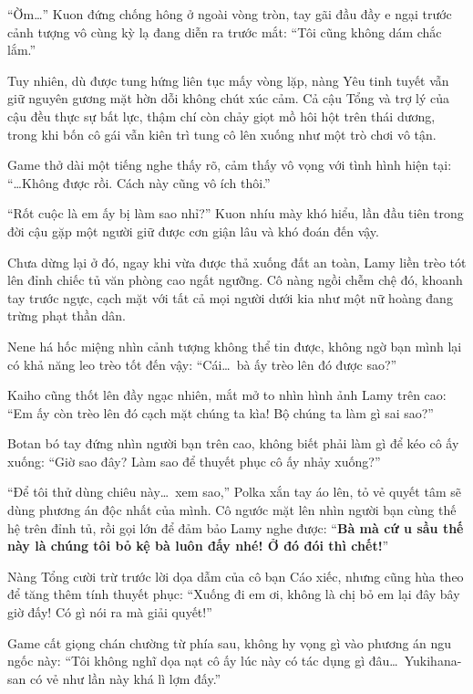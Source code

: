 \documentclass[../main.tex]{subfiles}
\begin{document}
``Ờm\dots'' Kuon đứng chống hông ở ngoài vòng tròn, tay gãi đầu đầy e ngại trước cảnh tượng vô cùng kỳ lạ đang diễn ra trước mắt: ``Tôi cũng không dám chắc lắm.''

Tuy nhiên, dù được tung hứng liên tục mấy vòng lặp, nàng Yêu tinh tuyết vẫn giữ nguyên gương mặt hờn dỗi không chút xúc cảm. Cả cậu Tổng và trợ lý của cậu đều thực sự bất lực, thậm chí còn chảy giọt mồ hôi hột trên thái dương, trong khi bốn cô gái vẫn kiên trì tung cô lên xuống như một trò chơi vô tận.

Game thở dài một tiếng nghe thấy rõ, cảm thấy vô vọng với tình hình hiện tại: ``\dots Không được rồi. Cách này cũng vô ích thôi.''

``Rốt cuộc là em ấy bị làm sao nhỉ?'' Kuon nhíu mày khó hiểu, lần đầu tiên trong đời cậu gặp một người giữ được cơn giận lâu và khó đoán đến vậy.

Chưa dừng lại ở đó, ngay khi vừa được thả xuống đất an toàn, Lamy liền trèo tót lên đỉnh chiếc tủ văn phòng cao ngất ngưỡng. Cô nàng ngồi chễm chệ đó, khoanh tay trước ngực, cạch mặt với tất cả mọi người dưới kia như một nữ hoàng đang trừng phạt thần dân.


Nene há hốc miệng nhìn cảnh tượng không thể tin được, không ngờ bạn mình lại có khả năng leo trèo tốt đến vậy: ``Cái\dots\ bà ấy trèo lên đó được sao?''

Kaiho cũng thốt lên đầy ngạc nhiên, mắt mở to nhìn hình ảnh Lamy trên cao: ``Em ấy còn trèo lên đó cạch mặt chúng ta kìa! Bộ chúng ta làm gì sai sao?''

Botan bó tay đứng nhìn người bạn trên cao, không biết phải làm gì để kéo cô ấy xuống: ``Giờ sao đây? Làm sao để thuyết phục cô ấy nhảy xuống?''

``Để tôi thử dùng chiêu này\dots\ xem sao,'' Polka xắn tay áo lên, tỏ vẻ quyết tâm sẽ dùng phương án độc nhất của mình. Cô ngước mặt lên nhìn người bạn cùng thế hệ trên đỉnh tủ, rồi gọi lớn để đảm bảo Lamy nghe được: ``\textbf{Bà mà cứ u sầu thế này là chúng tôi bỏ kệ bà luôn đấy nhé! Ở đó đói thì chết!}''

Nàng Tổng cười trừ trước lời dọa dẫm của cô bạn Cáo xiếc, nhưng cũng hùa theo để tăng thêm tính thuyết phục: ``Xuống đi em ơi, không là chị bỏ em lại đây bây giờ đấy! Có gì nói ra mà giải quyết!''

Game cất giọng chán chường từ phía sau, không hy vọng gì vào phương án ngu ngốc này: ``Tôi không nghĩ dọa nạt cô ấy lúc này có tác dụng gì đâu\dots\ Yukihana-san có vẻ như lần này khá lì lợm đấy.''
\end{document}
